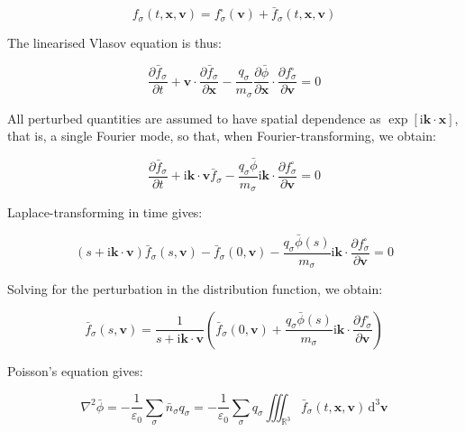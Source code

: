 \begin{equation}
    f_\sigma(t,\mathbf{x},\mathbf{v})=f_\sigma^\square(\mathbf{v})+\bar{f}_\sigma(t,\mathbf{x},\mathbf{v})
\end{equation}

The linearised Vlasov equation is thus:

\begin{equation}
    \frac{\partial\bar{f}_\sigma}{\partial t}+\mathbf{v}\cdot\frac{\partial\bar{f}_\sigma}{\partial\mathbf{x}}-\frac{q_\sigma}{m_\sigma}\frac{\partial\bar{\phi}}{\partial\mathbf{x}}\cdot\frac{\partial f_\sigma^\square}{\partial\mathbf{v}}=0
\end{equation}

All perturbed quantities are assumed to have spatial dependence as $\exp{[\mathrm{i}\mathbf{k}\cdot\mathbf{x}]}$, that is, a single Fourier mode, so that, when Fourier-transforming, we obtain:

\begin{equation}
    \frac{\partial\bar{f}_\sigma}{\partial t}+\mathrm{i}\mathbf{k}\cdot\mathbf{v}\bar{f}_\sigma-\frac{q_\sigma\bar{\phi}}{m_\sigma}\mathrm{i}\mathbf{k}\cdot\frac{\partial f_\sigma^\square}{\partial\mathbf{v}}=0
\end{equation}

Laplace-transforming in time gives:

\begin{equation}
    (s+\mathrm{i}\mathbf{k}\cdot\mathbf{v})\bar{f}_\sigma(s,\mathbf{v})-\bar{f}_\sigma(0,\mathbf{v})-\frac{q_\sigma\bar{\phi}(s)}{m_\sigma}\mathrm{i}\mathbf{k}\cdot\frac{\partial f_\sigma^\square}{\partial\mathbf{v}}=0
\end{equation}

Solving for the perturbation in the distribution function, we obtain:

\begin{equation}
    \bar{f}_\sigma(s,\mathbf{v})=\frac{1}{s+\mathrm{i}\mathbf{k}\cdot\mathbf{v}}\left(\bar{f}_\sigma(0,\mathbf{v})+\frac{q_\sigma\bar{\phi}(s)}{m_\sigma}\mathrm{i}\mathbf{k}\cdot\frac{\partial f_\sigma^\square}{\partial\mathbf{v}}\right)
\end{equation}

Poisson's equation gives:

\begin{equation}
    \nabla^2\bar{\phi}=-\frac{1}{\varepsilon_0}\sum_{\sigma}\bar{n}_\sigma q_\sigma=-\frac{1}{\varepsilon_0}\sum_{\sigma}q_\sigma\iiint_{\mathbb{R}^3}\bar{f}_\sigma(t,\mathbf{x},\mathbf{v})\,\mathrm{d}^3\mathbf{v}
\end{equation}


